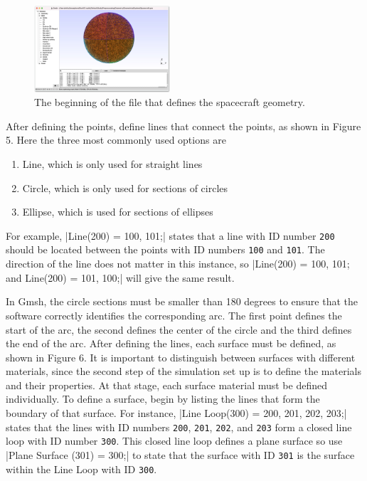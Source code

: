 \documentclass[a4paper, 11pt]{article}
\begin{document}
\begin{figure}[!ht]
    \centering
    \includegraphics[width=0.45\textwidth]{fig4.jpg}
    \caption{The beginning of the file that defines the spacecraft geometry.}
\end{figure}

After defining the points, define lines that connect the points, as shown in Figure 5. Here the three most commonly used options are
\begin{enumerate}
    \item Line, which is only used for straight lines
    \item Circle, which is only used for sections of circles
    \item Ellipse, which is used for sections of ellipses
\end{enumerate}
For example, |Line(200) = {100, 101};| states that a line with ID number \verb|200| should be located between the points with ID numbers \verb|100| and \verb|101|. The direction of the line does not matter in this instance, so |Line(200) = {100, 101}; and Line(200) = {101, 100};| will give the same result.\par
In Gmsh, the circle sections must be smaller than 180 degrees to ensure that the software correctly identifies the corresponding arc. The first point defines the start of the arc, the second defines the center of the circle and the third defines the end of the arc. After defining the lines, each surface must be defined, as shown in Figure 6. It is important to distinguish between surfaces with different materials, since the second step of the simulation set up is to define the materials and their properties. At that stage, each surface material must be defined individually. To define a surface, begin by listing the lines that form the boundary of that surface. For instance, |Line Loop(300) = {200, 201, 202, 203};| states that the lines with ID numbers \verb|200|, \verb|201|, \verb|202|, and \verb|203| form a closed line loop with ID number \verb|300|. This closed line loop defines a plane surface so use |Plane Surface (301) = {300};| to state that the surface with ID \verb|301| is the surface within the Line Loop with ID \verb|300|.
\end{document}
